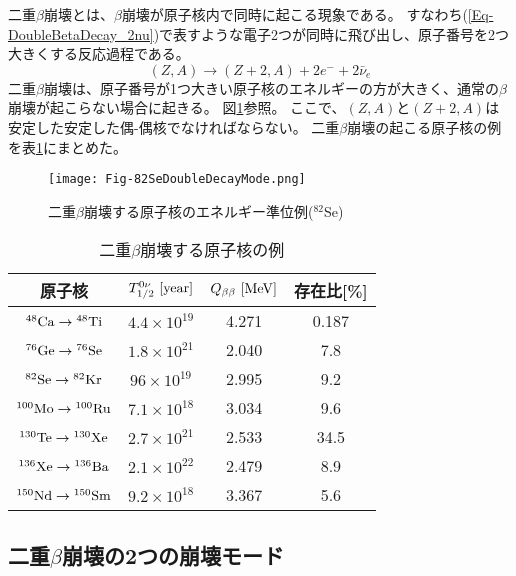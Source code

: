 \documentclass[a4paper,10pt]{jreport}
\begin{document}
二重$\beta$崩壊とは、$\beta$崩壊が原子核内で同時に起こる現象である。
すなわち(\ref{Eq-DoubleBetaDecay_2nu})で表すような電子2つが同時に飛び出し、原子番号を2つ大きくする反応過程である。
\begin{equation} \label{Eq-DoubleBetaDecay_2nu}
	(Z,A)\to(Z+2,A)+2e^-+2\bar{\nu}_e
\end{equation}
二重$\beta$崩壊は、原子番号が1つ大きい原子核のエネルギーの方が大きく、通常の$\beta$崩壊が起こらない場合に起きる。
図\ref{Fig-82SeDoubleDecayMode}参照。
ここで、$(Z,A)$と$(Z+2,A)$は安定した安定した偶-偶核でなければならない。
二重$\beta$崩壊の起こる原子核の例を表\ref{Tab-82SeDoubleDecayTable}にまとめた。

\begin{figure}[H]
	\center
	\texttt{[image: Fig-82SeDoubleDecayMode.png]}
	\caption{二重$\beta$崩壊する原子核のエネルギー準位例($^{82}$Se)} \label{Fig-82SeDoubleDecayMode}
\end{figure}

\begin{table}[H] 
	\center
	\caption{二重$\beta$崩壊する原子核の例\cite{Syuron_2011}} \label{Tab-82SeDoubleDecayTable}
	\begin{tabular}{cccc}
		\hline
		原子核 & $T_{1/2}^{0\nu}\ [\rm{year}]$ & $Q_{\beta\beta}\ [\rm{MeV}]$ & 存在比[\%] \\
		\hline
		$\rm{{^{48}Ca} \to {^{48}Ti}}$ & $4.4\times 10^{19}$ & 4.271 & 0.187 \\
		$\rm{{^{76}Ge} \to {^{76}Se}}$ & $1.8\times 10^{21}$ & 2.040 & 7.8 \\
		$\rm{{^{82}Se} \to {^{82}Kr}}$ & $96\times 10^{19}$ & 2.995 & 9.2 \\
		$\rm{{^{100}Mo} \to {^{100}Ru}}$ & $7.1\times 10^{18}$ & 3.034 & 9.6 \\
		$\rm{{^{130}Te} \to {^{130}Xe}}$ & $2.7\times 10^{21}$ & 2.533 & 34.5 \\
		$\rm{{^{136}Xe} \to {^{136}Ba}}$ & $2.1\times 10^{22}$ & 2.479 & 8.9 \\
		$\rm{{^{150}Nd} \to {^{150}Sm}}$ & $9.2\times 10^{18}$ & 3.367 & 5.6 \\
		\hline
	\end{tabular}
\end{table}



\subsection{二重$\beta$崩壊の2つの崩壊モード}
\end{document}
